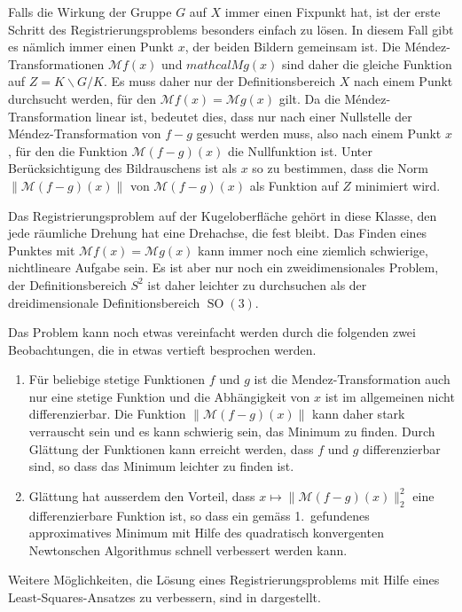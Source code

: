Falls die Wirkung der Gruppe $G$ auf $X$ immer einen Fixpunkt hat,
ist der erste Schritt des Registrierungsproblems besonders einfach
zu lösen.
In diesem Fall gibt es nämlich immer einen Punkt $x$, der beiden
Bildern gemeinsam ist.
Die Méndez-Transformationen $\mathcal{M}f(x)$ und $mathcal{M}g(x)$
sind daher die gleiche Funktion auf $Z=K\backslash G/K$.
Es muss daher nur der Definitionsbereich $X$ nach einem Punkt
durchsucht werden, für den $\mathcal{M}f(x) = \mathcal{M}g(x)$
gilt.
Da die Méndez-Transformation linear ist, bedeutet dies, dass nur
nach einer Nullstelle der Méndez-Transformation von $f-g$ gesucht
werden muss, also nach einem Punkt $x$, für den die Funktion
\(
\mathcal{M}(f-g)(x)
\)
die Nullfunktion ist.
Unter Berücksichtigung des Bildrauschens ist als $x$ so zu bestimmen,
dass die Norm $\| \mathcal{M}(f-g)(x) \|$ von $\mathcal{M}(f-g)(x)$
als Funktion auf $Z$ minimiert wird.

Das Registrierungsproblem auf der Kugeloberfläche gehört in diese
Klasse, den jede räumliche Drehung hat eine Drehachse, die fest
bleibt.
Das Finden eines Punktes mit $\mathcal{M}f(x)=\mathcal{M}g(x)$ 
kann immer noch eine ziemlich schwierige, nichtlineare Aufgabe sein.
Es ist aber nur noch ein zweidimensionales Problem, der Definitionsbereich
$S^2$ ist daher leichter zu durchsuchen als der dreidimensionale
Definitionsbereich $\operatorname{SO}(3)$.

Das Problem kann noch etwas vereinfacht werden durch die folgenden zwei
Beobachtungen, die in \cite{buch:mendez-mueller} etwas vertieft besprochen
werden.
\begin{enumerate}
\item
Für beliebige stetige Funktionen $f$ und $g$ ist die
Mendez-Transformation auch nur eine stetige Funktion und die
Abhängigkeit von $x$ ist im allgemeinen nicht differenzierbar.
Die Funktion $\|\mathcal{M}(f-g)(x)\|$ kann daher stark verrauscht
sein und es kann schwierig sein, das Minimum zu finden.
Durch Glättung der Funktionen kann erreicht werden, dass $f$ und $g$
differenzierbar sind, so dass das Minimum leichter zu finden ist.
\item
Glättung hat ausserdem den Vorteil, dass $x\mapsto\|\mathcal{M}(f-g)(x)\|_2^2$
eine differenzierbare Funktion ist, so dass ein gemäss 1.~gefundenes
approximatives Minimum mit Hilfe des quadratisch konvergenten Newtonschen
Algorithmus schnell verbessert werden kann.
\end{enumerate}

Weitere Möglichkeiten, die Lösung eines Registrierungsproblems mit
Hilfe eines Least-Squares-Ansatzes zu verbessern, sind in
\cite[chapter 3]{buch:reg} dargestellt.

